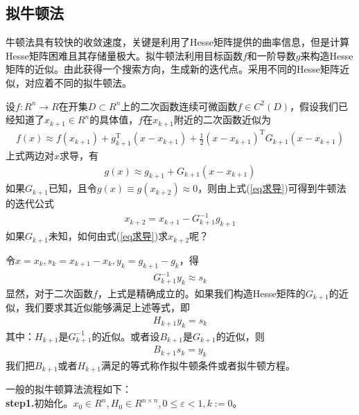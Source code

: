     \subsection{拟牛顿法}
        \par
        牛顿法具有较快的收敛速度，关键是利用了Hesse矩阵提供的曲率信息，但是计算Hesse矩阵困难且其存储量极大。拟牛顿法利用目标函数$f$和一阶导数$g$来构造Hesse矩阵的近似。由此获得一个搜索方向，生成新的迭代点。采用不同的Hesse矩阵近似，对应着不同的拟牛顿法。
        \par
        设$f:R^n \to R$在开集$D \subset R^n$上的二次函数连续可微函数$f \in C^2(D)$，假设我们已经知道了$x_{k+1} \in R^n$的具体值，$f$在$x_{k+1}$附近的二次函数近似为
        \begin{align*}
         f(x) \approx f(x_{k+1})+g_{k+1}^\mathrm{T} (x-x_{k+1})+\frac 12 (x-x_{k+1})^\mathrm{T} G_{k+1}(x-x_{k+1})
        \end{align*}
        上式两边对$x$求导，有
        \begin{align}
         \label{eq求导}
         g(x) \approx g_{k+1} + G_{k+1}(x-x_{k+1})
        \end{align}
        如果$G_{k+1}$已知，且令$g(x) \equiv g(x_{k+2}) \approx 0$，则由上式(\ref{eq求导})可得到牛顿法的迭代公式
         \begin{align*}
         x_{k+2}=x_{k+1}-G_{k+1}^{-1}g_{k+1}
        \end{align*}
        如果$G_{k+1}$未知，如何由式(\ref{eq求导})求$x_{k+2}$呢？
        \par
        令$x=x_k,s_k=x_{k+1}-x_k,y_k=g_{k+1}-g_k$，得
         \begin{align*}
         G_{k+1}^{-1}y_k \approx s_k
        \end{align*}
        显然，对于二次函数$f$，上式是精确成立的。如果我们构造Hesse矩阵的$G_{k+1}$的近似，我们要求其近似能够满足上述等式，即
         \begin{align*}
         H_{k+1} y_k = s_k
        \end{align*}
        其中：$H_{k+1}$是$G_{k+1}^{-1} $的近似。或者设$B_{k+1}$是$G_{k+1}$的近似，则
         \begin{align*}
         B_{k+1} s_k = y_k
        \end{align*}
        我们把$B_{k+1}$或者$H_{k+1}$满足的等式称作拟牛顿条件或者拟牛顿方程。
        \par
        一般的拟牛顿算法流程如下：\\
        \textbf{step1.}初始化。$x_0 \in R^n,H_0 \in R^{n \times n},0 \leqslant \varepsilon <1,k:=0$。\\
